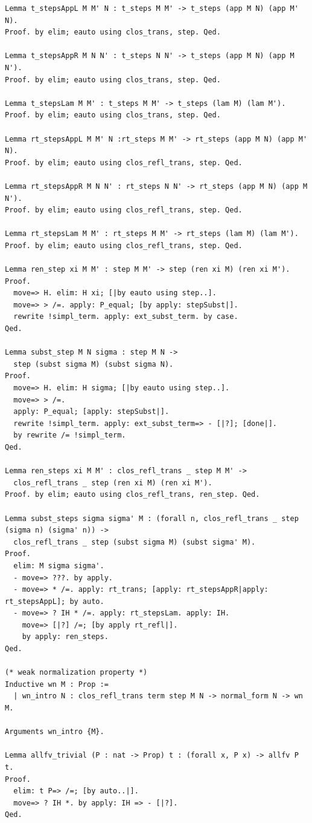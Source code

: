 \documentclass[10pt,a4paper]{amsart}
\begin{document}
\begin{lstlisting}
Lemma t_stepsAppL M M' N : t_steps M M' -> t_steps (app M N) (app M' N).
Proof. by elim; eauto using clos_trans, step. Qed.

Lemma t_stepsAppR M N N' : t_steps N N' -> t_steps (app M N) (app M N').
Proof. by elim; eauto using clos_trans, step. Qed.

Lemma t_stepsLam M M' : t_steps M M' -> t_steps (lam M) (lam M').
Proof. by elim; eauto using clos_trans, step. Qed.

Lemma rt_stepsAppL M M' N :rt_steps M M' -> rt_steps (app M N) (app M' N).
Proof. by elim; eauto using clos_refl_trans, step. Qed.

Lemma rt_stepsAppR M N N' : rt_steps N N' -> rt_steps (app M N) (app M N').
Proof. by elim; eauto using clos_refl_trans, step. Qed.

Lemma rt_stepsLam M M' : rt_steps M M' -> rt_steps (lam M) (lam M').
Proof. by elim; eauto using clos_refl_trans, step. Qed.

Lemma ren_step xi M M' : step M M' -> step (ren xi M) (ren xi M').
Proof.
  move=> H. elim: H xi; [|by eauto using step..].
  move=> > /=. apply: P_equal; [by apply: stepSubst|].
  rewrite !simpl_term. apply: ext_subst_term. by case.
Qed.

Lemma subst_step M N sigma : step M N ->
  step (subst sigma M) (subst sigma N).
Proof.
  move=> H. elim: H sigma; [|by eauto using step..].
  move=> > /=.
  apply: P_equal; [apply: stepSubst|].
  rewrite !simpl_term. apply: ext_subst_term=> - [|?]; [done|].
  by rewrite /= !simpl_term.
Qed.

Lemma ren_steps xi M M' : clos_refl_trans _ step M M' ->
  clos_refl_trans _ step (ren xi M) (ren xi M').
Proof. by elim; eauto using clos_refl_trans, ren_step. Qed.

Lemma subst_steps sigma sigma' M : (forall n, clos_refl_trans _ step (sigma n) (sigma' n)) ->
  clos_refl_trans _ step (subst sigma M) (subst sigma' M).
Proof.
  elim: M sigma sigma'.
  - move=> ???. by apply.
  - move=> * /=. apply: rt_trans; [apply: rt_stepsAppR|apply: rt_stepsAppL]; by auto.
  - move=> ? IH * /=. apply: rt_stepsLam. apply: IH.
    move=> [|?] /=; [by apply rt_refl|].
    by apply: ren_steps.
Qed.

(* weak normalization property *)
Inductive wn M : Prop :=
  | wn_intro N : clos_refl_trans term step M N -> normal_form N -> wn M.

Arguments wn_intro {M}.

Lemma allfv_trivial (P : nat -> Prop) t : (forall x, P x) -> allfv P t.
Proof.
  elim: t P=> /=; [by auto..|].
  move=> ? IH *. by apply: IH => - [|?].
Qed.


\end{lstlisting}
\end{document}
